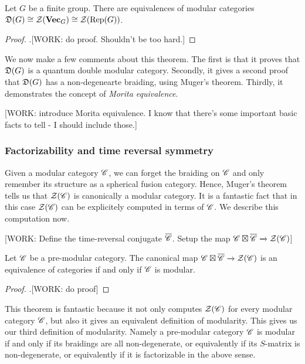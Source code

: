 \begin{proposition} Let $G$ be a finite group. There are equivalences of modular categories $\mathfrak{D}(G)\cong \mathcal{Z}(\mathbf{Vec}_G)\cong \mathcal{Z}(\operatorname{Rep}(G))$.
\end{proposition}
\begin{proof}.[WORK: do proof. Shouldn't be too hard.]
\end{proof}

We now make a few comments about this theorem. The first is that it proves that $\mathfrak{D}(G)$ is a quantum double modular category. Secondly, it gives a second proof that $\mathfrak{D}(G)$ has a non-degenearte braiding, using Muger's theorem. Thirdly, it demonstrates the concept of \textit{Morita equivalence}.

[WORK: introduce Morita equivalence. I know that there's some important basic facts to tell - I should include those.]

\subsubsection{Factorizability and time reversal symmetry}

Given a modular category $\mathscr{C}$, we can forget the braiding on $\mathscr{C}$ and only remember its structure as a spherical fusion category. Hence, Muger's theorem tells us that $\mathcal{Z}(\mathscr{C})$ is canonically a modular category. It is a fantastic fact that in this case $\mathcal{Z}(\mathscr{C})$ can be explicitely computed in terms of $\mathscr{C}$. We describe this computation now.

[WORK: Define the time-reversal conjugate $\overline{\mathscr{C}}$. Setup the map $\mathscr{C}\boxtimes \overline{\mathscr{C}}\xrightarrow{}\mathcal{Z}(\mathscr{C})$]

\begin{proposition} Let $\mathscr{C}$ be a pre-modular category. The canonical map $\mathscr{C}\boxtimes \overline{\mathscr{C}}\xrightarrow{}\mathcal{Z}(\mathscr{C})$ is an equivalence of categories if and only if $\mathscr{C}$ is modular.
\end{proposition}
\begin{proof}.[WORK: do proof]
\end{proof}

This theorem is fantastic because it not only computes $\mathcal{Z}(\mathscr{C})$ for every modular category $\mathscr{C}$, but also it gives an equivalent definition of modularity. This gives us our third definition of modularity. Namely a pre-modular category $\mathscr{C}$ is modular if and only if its braidings are all non-degenerate, or equivalently if its $S$-matrix is non-degenerate, or equivalently if it is factorizable in the above sense.


